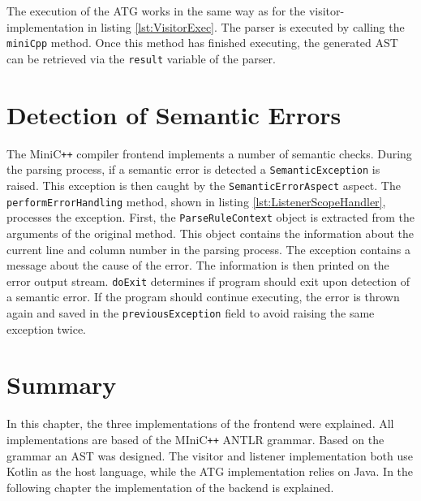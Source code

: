 The execution of the ATG works in the same way as for the visitor-implementation in listing \ref{lst:VisitorExec}. The parser is executed by calling the \verb|miniCpp| method. Once this method has finished executing, the generated AST can be retrieved via the \verb|result| variable of the parser. 


\section{Detection of Semantic Errors}

The MiniC\verb|++| compiler frontend implements a number of semantic checks. During the parsing process, if a semantic error is detected a \verb|SemanticException| is raised. This exception is then caught by the \verb|SemanticErrorAspect| aspect. The \verb|performErrorHandling| method, shown in listing \ref{lst:ListenerScopeHandler}, processes the exception. First, the \verb|ParseRuleContext| object is extracted from the arguments of the original method. This object contains the information about the current line and column number in the parsing process. The exception contains a message about the cause of the error. The information is then printed on the error output stream. \verb|doExit| determines if program should exit upon detection of a semantic error. If the program should continue executing, the error is thrown again and saved in the \verb|previousException| field to avoid raising the same exception twice.    



\section{Summary}

In this chapter, the three implementations of the frontend were explained. All implementations are based of the MIniC\verb|++| ANTLR grammar. Based on the grammar an AST was designed. The visitor and listener implementation both use Kotlin as the host language, while the ATG implementation relies on Java. In the following chapter the implementation of the backend is explained.